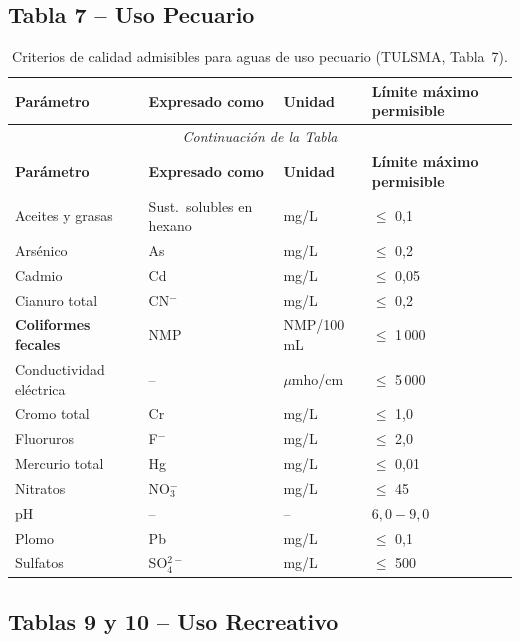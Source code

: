 \documentclass[12pt,a4paper]{article}
\begin{document}
\subsection{Tabla 7 -- Uso Pecuario}

\small
\begin{longtable}{p{4.5cm}p{2.0cm}p{2.0cm}p{3.5cm}}
\caption{Criterios de calidad admisibles para aguas de uso pecuario (TULSMA, Tabla~7).}\\
\toprule
\textbf{Par\'ametro} & \textbf{Expresado como} & \textbf{Unidad} & \textbf{L\'imite m\'aximo permisible} \\
\midrule
\endfirsthead
\multicolumn{4}{c}{\small\itshape Continuaci\'on de la Tabla}\\
\toprule
\textbf{Par\'ametro} & \textbf{Expresado como} & \textbf{Unidad} & \textbf{L\'imite m\'aximo permisible} \\
\midrule
\endhead
\bottomrule
\endlastfoot
Aceites y grasas & Sust.\ solubles en hexano & mg/L & $\leq$ 0,1 \\
Ars\'enico & As & mg/L & $\leq$ 0,2 \\
Cadmio & Cd & mg/L & $\leq$ 0,05 \\
Cianuro total & CN$^-$ & mg/L & $\leq$ 0,2 \\
\textbf{Coliformes fecales} & NMP & NMP/100 mL & $\leq$ 1\,000 \\
Conductividad el\'ectrica & -- & $\mu$mho/cm & $\leq$ 5\,000 \\
Cromo total & Cr & mg/L & $\leq$ 1,0 \\
Fluoruros & F$^-$ & mg/L & $\leq$ 2,0 \\
Mercurio total & Hg & mg/L & $\leq$ 0,01 \\
Nitratos & NO$_3^-$ & mg/L & $\leq$ 45 \\
pH & -- & -- & $6,0 - 9,0$ \\
Plomo & Pb & mg/L & $\leq$ 0,1 \\
Sulfatos & SO$_4^{2-}$ & mg/L & $\leq$ 500 \\
\end{longtable}

\subsection{Tablas 9 y 10 -- Uso Recreativo}
\end{document}
